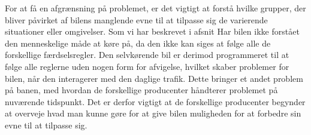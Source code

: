 For at få en afgrænsning på problemet, er det vigtigt at forstå hvilke grupper, der bliver påvirket af bilens manglende evne til at tilpasse sig de varierende situationer eller omgivelser. Som vi har beskrevet i afsnit \label {interaktion} 
Har bilen ikke forstået den menneskelige måde at køre på, da den ikke kan siges at følge alle de forskellige færdselsregler. Den selvkørende bil er derimod programmeret til at følge alle reglerne uden nogen form for afvigelse, hvilket skaber problemer for bilen, når den interagerer med den daglige trafik. Dette bringer et andet problem på banen, med hvordan de forskellige producenter håndterer problemet på nuværende tidspunkt. Det er derfor vigtigt at de forskellige producenter begynder at overveje hvad man kunne gøre for at give bilen muligheden for at forbedre sin evne til at tilpasse sig. 
